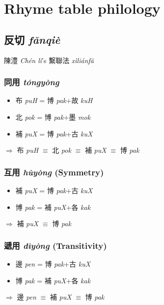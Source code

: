 \documentclass[oneside,a4paper,11pt]{article}
\newcommand{\ipa}[1]{{\phon\textit{#1}}}
\newcommand{\zh}[1]{{\cn #1}}
\newcommand{\zhc}[2]{\zh{#1} \ipa{#2}}
\begin{document}
\section{Rhyme table philology} 

\subsection{\zhc{反切}{fǎnqiè}} \label{sec:fanqie}

\zhc{陳澧}{Chén lǐ}'s \zhc{繫聯法}{xìliánfǎ}

\subsubsection{\zhc{同用}{tóngyòng}}
\begin{itemize}
\item \zhc{布}{puH} = \zhc{博}{pak}+\zhc{故}{kuH}
\item \zhc{北}{pok} = \zhc{博}{pak}+\zhc{墨}{mok}
\item \zhc{補}{puX} = \zhc{博}{pak}+\zhc{古}{kuX}
\end{itemize}
$\Rightarrow$ \zhc{布}{puH} $\equiv$ \zhc{北}{pok} $\equiv$ \zhc{補}{puX} $\equiv$  \zhc{博}{pak}
\subsubsection{\zhc{互用}{hùyòng} (Symmetry)}
\begin{itemize}
\item \zhc{補}{puX} = \zhc{博}{pak}+\zhc{古}{kuX}
\item \zhc{博}{pak} =  \zhc{補}{puX}+\zhc{各}{kak}
\end{itemize}
$\Rightarrow$  \zhc{補}{puX} $\equiv$  \zhc{博}{pak}
\subsubsection{\zhc{遞用}{dìyòng} (Transitivity)}
\begin{itemize}
\item \zhc{邊}{pen} = \zhc{博}{pak}+\zhc{古}{kuX}
\item \zhc{博}{pak} =  \zhc{補}{puX}+\zhc{各}{kak}
\end{itemize}
$\Rightarrow$  \zhc{邊}{pen} $\equiv$ \zhc{補}{puX} $\equiv$  \zhc{博}{pak}
\end{document}
